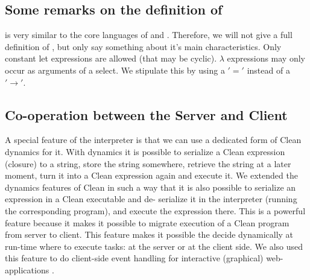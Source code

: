 \subsection{Some remarks on the definition of \Sapl}
\Sapl is very similar to the core languages of \Haskell and \Clean. 
Therefore, we will not give a full definition of \Sapl, but only say something about it's main characteristics.
Only constant let expressions are allowed (that may be cyclic).
$\lambda$ expressions may only occur as arguments of a \textsf{select}. We stipulate this by using a $'='$ instead of a $'\to'$.

\subsection{Co-operation between the Server and Client}
A special feature of the \Sapl interpreter is that we can use a dedicated form of \textsf{Clean} 
dynamics \cite{weea07n:PhD} for it. With dynamics it is possible to serialize a \textsf{Clean} expression 
(closure) to a string, store the string somewhere, retrieve the string at a later moment, turn it into a 
\textsf{Clean} expression again and execute it. We extended the dynamics features of \textsf{Clean} in 
such a way that it is also possible to serialize an expression in a \textsf{Clean} executable and de-
serialize it in the \Sapl interpreter (running the corresponding \Sapl program), and execute the 
expression there. This is a powerful feature because it makes it possible to migrate execution of a 
\textsf{Clean} program from server to client.  
This feature makes it possible the decide dynamically at run-time where to execute tasks:
at the server or at the client side.
We also used this feature to do client-side event handling for interactive (graphical) web-applications 
\cite{iEditors}. 


